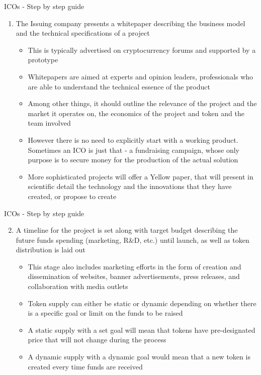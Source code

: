 \documentclass[9pt]{beamer}
\begin{document}
\begin{frame}{ICOs - Step by step guide}
	\begin{enumerate}
		\item The Issuing company presents a whitepaper describing the business model and the technical specifications of a project
		\begin{itemize}
			\item This is typically advertised on cryptocurrency forums and supported by a prototype
			\item Whitepapers are aimed at experts and opinion leaders, professionals who are able to understand the technical essence of the product
			\item Among other things, it should outline the relevance of the project and the market it operates on, the economics of the project and token and the team involved
			\item However there is no need to explicitly start with a working product. Sometimes an ICO is just that - a fundraising campaign, whose only purpose is to secure money for the production of the actual solution
			\item More sophisticated projects will offer a Yellow paper, that will present in scientific detail the technology and the innovations that they have created, or propose to create
		\end{itemize}
	\end{enumerate}
\end{frame}


\begin{frame}{ICOs - Step by step guide}
	\begin{enumerate}
		\setcounter{enumi}{1}
		\item A timeline for the project is set along with target budget describing the future funds spending (marketing, R\&D, etc.) until launch, as well as token distribution is laid out
		\begin{itemize}
			\item This stage also includes marketing efforts in the form of creation and dissemination of websites, banner advertisements, press releases, and collaboration with media outlets
			\item Token supply can either be static or dynamic depending on whether there is a specific goal or limit on the funds to be raised
			\item A static supply with a set goal will mean that tokens have pre-designated price that will not change during the process
			\item A dynamic supply with a dynamic goal would mean that a new token is created every time funds are received
		\end{itemize}
	\end{enumerate}
\end{frame}
\end{document}
